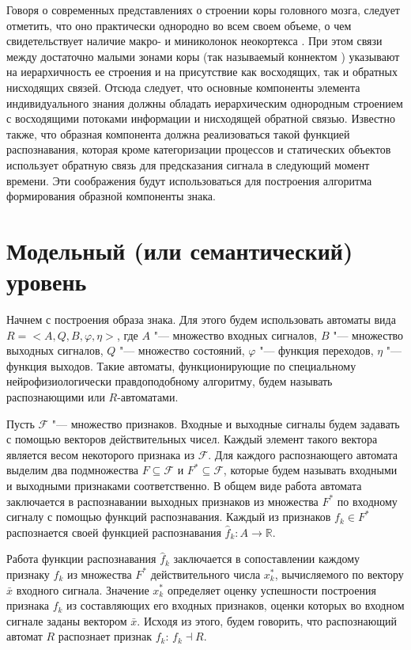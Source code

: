 \documentclass[a4paper, 12pt]{article}
\numberwithin{equation}{section}
\begin{document}
	Говоря о современных представлениях о строении коры головного мозга, следует отметить, что оно практически однородно во всем своем объеме, о чем свидетельствует наличие макро- и миниколонок неокортекса \cite{Mountcastle1998,Rockland2010}. При этом связи между достаточно малыми зонами коры (так называемый коннектом \cite{Zador2012}) указывают на иерархичность ее строения и на присутствие как восходящих, так и обратных нисходящих связей. Отсюда следует, что основные компоненты элемента индивидуального знания должны обладать иерархическим однородным строением с восходящими потоками информации и нисходящей обратной связью. Известно также, что образная компонента должна реализоваться такой функцией распознавания, которая кроме категоризации процессов и статических объектов использует обратную связь для предсказания сигнала в следующий момент времени. Эти соображения будут использоваться для построения алгоритма формирования образной компоненты знака.
	
	\section{Модельный (или семантический) уровень}\label{sect:seman}
	Начнем с построения образа знака. Для этого будем использовать автоматы вида  $R=<A,Q,B,\varphi, \eta>$, где $A$ "--- множество входных сигналов, $B$ "--- множество выходных сигналов, $Q$ "--- множество состояний, $\varphi$ "--- функция переходов, $\eta$ "--- функция выходов. Такие автоматы, функционирующие по специальному нейрофизиологически правдоподобному алгоритму, будем называть распознающими или $R$-автоматами. 
	
	Пусть $\mathcal F$ "--- множество признаков. Входные и выходные сигналы будем задавать с помощью  векторов действительных чисел. Каждый элемент такого вектора является весом некоторого признака из $\mathcal F$. Для каждого распознающего автомата выделим два подмножества $F\subseteq\mathcal F$ и $F^*\subseteq\mathcal F$, которые будем называть входными и выходными признаками соответственно. В общем виде работа автомата заключается в распознавании выходных признаков из множества $F^*$ по входному сигналу с помощью функций распознавания. Каждый из признаков $f_k\in F^*$ распознается своей функцией распознавания $\hat f_k: A\rightarrow \mathbb R$.
	
	Работа функции распознавания $\hat f_k$ заключается в сопоставлении каждому признаку $f_k$ из множества $F^*$ действительного числа $x_k^*$, вычисляемого по вектору $\bar x$ входного сигнала. Значение $x_k^*$ определяет оценку успешности построения признака $f_k$ из составляющих его входных признаков, оценки которых во входном сигнале заданы вектором $\bar x$. Исходя из этого, будем говорить, что распознающий автомат $R$ распознает признак $f_k$: $f_k\dashv R$.
	
\end{document}
